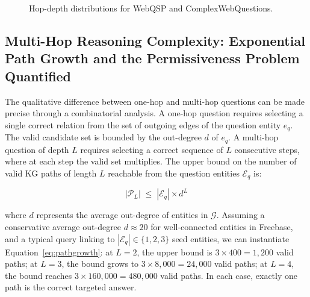 \begin{figure}[H]
    \centering
    \caption{Hop-depth distributions for WebQSP and ComplexWebQuestions.}
    \label{fig:benchmark_hops}
\end{figure}

\subsection{Multi-Hop Reasoning Complexity: Exponential Path Growth and the
    Permissiveness Problem Quantified}

The qualitative difference between one-hop and multi-hop questions can be made
precise through a combinatorial analysis. A one-hop question requires selecting
a single correct relation from the set of outgoing edges of the question entity
$e_q$. The valid candidate set is bounded by the out-degree $d$ of $e_q$.
A multi-hop question of depth $L$ requires selecting a correct sequence of
$L$ consecutive steps, where at each step the valid set multiplies. The upper
bound on the number of valid KG paths of length $L$ reachable from the question
entities $\mathcal{E}_q$ is:

\begin{equation}
    |\mathcal{P}_L| \;\leq\; |\mathcal{E}_q| \times d^L
    \label{eq:pathgrowth}
\end{equation}

where $d$ represents the average out-degree of entities in $\mathcal{G}$. Assuming a conservative average out-degree $d \approx 20$ for well-connected entities in Freebase, and a typical query linking to $|\mathcal{E}_q| \in \{1, 2, 3\}$ seed entities, we can instantiate
Equation~\eqref{eq:pathgrowth}: at $L = 2$, the upper bound is
$3 \times 400 = 1{,}200$ valid paths; at $L = 3$, the bound grows to
$3 \times 8{,}000 = 24{,}000$ valid paths; at $L = 4$, the bound reaches
$3 \times 160{,}000 = 480{,}000$ valid paths. In each case, exactly one path is the correct targeted answer.

